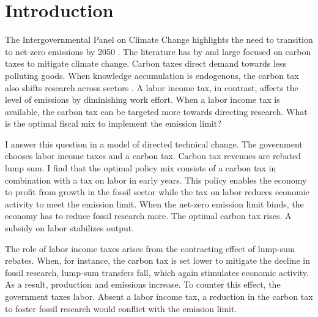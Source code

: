 \clearpage
\section{Introduction}




The Intergovernmental Panel on Climate Change highlights the need to transition to net-zero emissions by 2050 \citep{IPCC2022}. The literature has by and large focused on carbon taxes to mitigate climate change. Carbon taxes direct demand towards less polluting goods. When knowledge accumulation is endogenous, the carbon tax also shifts research across sectors \citep{Acemoglu2012TheChange}. A labor income tax, in contrast, affects the level of emissions by diminishing work effort. When a labor income tax is available, the carbon tax can be targeted more towards directing research. 
What is the optimal fiscal mix to implement the emission limit?

I answer this question in a model of directed technical change. The government chooses labor income taxes and a carbon tax. Carbon tax revenues are rebated lump sum. I find that the optimal policy mix consists of a carbon tax in combination with a tax on labor in early years. This policy enables the economy to profit from growth in the fossil sector while the tax on labor reduces economic activity to meet the emission limit. When the net-zero emission limit binds, the economy has to reduce fossil research more. The optimal carbon tax rises. A subsidy on labor stabilizes output. 

The role of labor income taxes arises from the contracting effect of lump-sum rebates. When, for instance, the carbon tax is set lower to mitigate the decline in fossil research, lump-sum transfers fall, which again stimulates economic activity. As a result, production and emissions increase. To counter this effect, the government taxes labor. Absent a labor income tax, a reduction in the carbon tax to foster fossil research would conflict with the emission limit.

